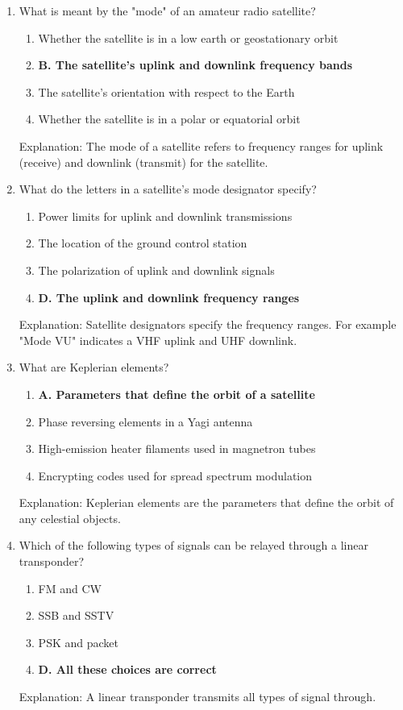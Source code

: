 \begin{enumerate}
    \item What is meant by the "mode" of an amateur radio satellite?
    \begin{enumerate}
    \item  Whether the satellite is in a low earth or geostationary orbit
        \item \textbf{B. The satellite's uplink and downlink frequency bands}
        \item  The satellite's orientation with respect to the Earth
       \item  Whether the satellite is in a polar or equatorial orbit
    \end{enumerate}
    \textcolor{myred}{Explanation:}
    The mode of a satellite refers to frequency ranges for uplink (receive) and downlink (transmit) for the satellite.
     
      \item What do the letters in a satellite's mode designator specify?
        \begin{enumerate}
        \item  Power limits for uplink and downlink transmissions
     \item  The location of the ground control station
         \item  The polarization of uplink and downlink signals
        \item \textbf{D. The uplink and downlink frequency ranges}
    \end{enumerate}
       \textcolor{myred}{Explanation:}
        Satellite designators specify the frequency ranges. For example "Mode VU" indicates a VHF uplink and UHF downlink.
       
        \item What are Keplerian elements?
        \begin{enumerate}
        \item \textbf{A. Parameters that define the orbit of a satellite}
        \item  Phase reversing elements in a Yagi antenna
    \item  High-emission heater filaments used in magnetron tubes
        \item  Encrypting codes used for spread spectrum modulation
    \end{enumerate}
        \textcolor{myred}{Explanation:}
        Keplerian elements are the parameters that define the orbit of any celestial objects.
    
        \item Which of the following types of signals can be relayed through a linear transponder?
        \begin{enumerate}
         \item  FM and CW
       \item  SSB and SSTV
       \item  PSK and packet
       \item \textbf{D. All these choices are correct}
        \end{enumerate}
    \textcolor{myred}{Explanation:}
     A linear transponder transmits all types of signal through.
      

\end{enumerate}
